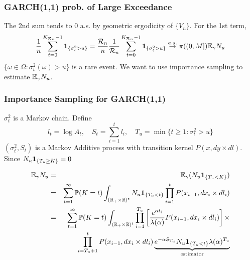 \documentclass{beamer}
\begin{document}
\begin{frame}
  \frametitle{GARCH(1,1) prob. of Large Exceedance}
  The 2nd sum tends to 0 a.s. by geometric ergodicity of
  $\{V_n\}$. For the 1st term,
  \[
  {1 \over n} \sum_{t=0}^{K_{\mathcal R_n} - 1} \mathbf{1}_{\{\sigma_t^2 > u\}}
  = {\mathcal R_n \over n} {1 \over \mathcal R_n}
  \sum_{t=0}^{K_{\mathcal R_n} - 1} \mathbf{1}_{\{\sigma_t^2 > u\}}
  \overset{a.s.}{\to} \pi((0, M]) \mathbb{E}_\gamma N_u
  \]
  $\{\omega \in \Omega: \sigma_t^2(\omega) > u\}$
  is a rare event. We want to use importance sampling to
  estimate $\mathbb{E}_\gamma N_u$.
\end{frame}

\begin{frame}
  \frametitle{Importance Sampling for GARCH(1,1)}
  $\sigma_{t}^2$ is a Markov chain. Define
  \[
  l_t = \log A_t, \quad
  S_t = \sum_{i=1}^{t} l_i, \quad
  T_u = \min\{t \geq 1: \sigma_t^2 > u\}
  \]
  $(\sigma_t^2, S_t)$ is a Markov Additive process with
  transition kernel $P(x, dy \times dl)$. Since $N_u \mathbf{1}_{\{T_u \geq
    K\}} = 0$
  \begin{footnotesize}
    \begin{eqnarray*}
      \mathbb{E}_\gamma N_u &=& \mathbb{E}_\gamma(N_u\mathbf{1}_{\{T_u < K\}}) \\
      &=&
      \sum_{t=1}^\infty
      \mathbb{P}(K=t)
      \int_{(\mathbb R_+ \times \mathbb R)^t}
      N_u \mathbf{1}_{\{T_u < t\}}
      \prod_{i=1}^{t} P(x_{i-1}, d x_{i} \times dl_{i})\\
      &=&
      \sum_{t=1}^\infty
      \mathbb{P}(K=t)
      \int_{(\mathbb R_+ \times \mathbb R)^t}
      \prod_{i=1}^{T_u} \left[
        {e^{\alpha l_i} \over \lambda(\alpha)}
        P(x_{i-1}, d x_{i} \times dl_{i})
        \right] \times \\
      &&
      \prod_{i=T_u + 1}^{t} P(x_{i-1}, dx_{i} \times dl_i)
      \underbrace{
        e^{-\alpha S_{T_u}} N_u\mathbf{1}_{\{T_u < t\}} \lambda(\alpha)^{T_u}
      }_{\text{estimator}}
    \end{eqnarray*}
  \end{footnotesize}
\end{frame}
\end{document}
